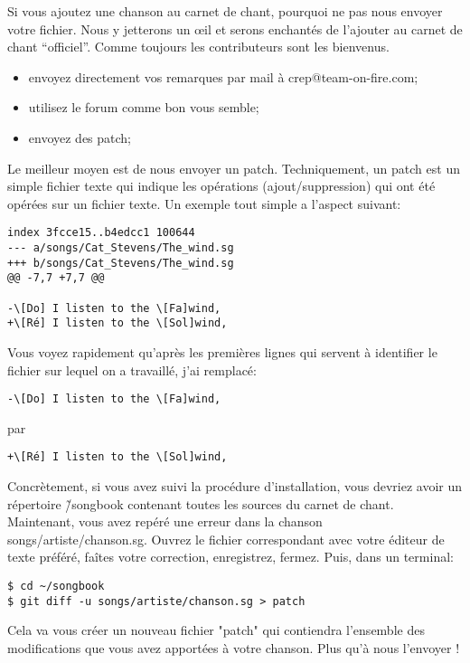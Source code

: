 \documentclass[a4paper,twoside]{article}
\begin{document}
Si vous ajoutez une chanson au carnet de chant, pourquoi ne pas nous
envoyer votre fichier. Nous y jetterons un \oe{}il et serons enchantés
de l'ajouter au carnet de chant ``officiel''. Comme toujours les
contributeurs sont les bienvenus.

\begin{itemize}
\item envoyez directement vos remarques par mail à crep@team-on-fire.com;
\item utilisez le forum comme bon vous semble;
\item envoyez des patch;
\end{itemize}

Le meilleur moyen est de nous envoyer un patch. Techniquement, un
patch est un simple fichier texte qui indique les opérations
(ajout/suppression) qui ont été opérées sur un fichier texte. Un
exemple tout simple a l'aspect suivant:

\begin{verbatim}
index 3fcce15..b4edcc1 100644
--- a/songs/Cat_Stevens/The_wind.sg
+++ b/songs/Cat_Stevens/The_wind.sg
@@ -7,7 +7,7 @@

-\[Do] I listen to the \[Fa]wind,
+\[Ré] I listen to the \[Sol]wind,
\end{verbatim}

Vous voyez rapidement qu'après les premières lignes qui servent à
identifier le fichier sur lequel on a travaillé, j'ai remplacé:
\begin{verbatim}
-\[Do] I listen to the \[Fa]wind,
\end{verbatim}
par
\begin{verbatim}
+\[Ré] I listen to the \[Sol]wind,
\end{verbatim}

Concrètement, si vous avez suivi la procédure d'installation,
vous devriez avoir un répertoire \~/songbook contenant toutes les
sources du carnet de chant. Maintenant, vous avez repéré une erreur
dans la chanson songs/artiste/chanson.sg. Ouvrez le fichier
correspondant avec votre éditeur de texte préféré, faîtes votre
correction, enregistrez, fermez. Puis, dans un terminal:

\begin{verbatim}
$ cd ~/songbook
$ git diff -u songs/artiste/chanson.sg > patch
\end{verbatim}

Cela va vous créer un nouveau fichier "patch" qui contiendra
l'ensemble des modifications que vous avez apportées à votre
chanson. Plus qu'à nous l'envoyer !
\end{document}
